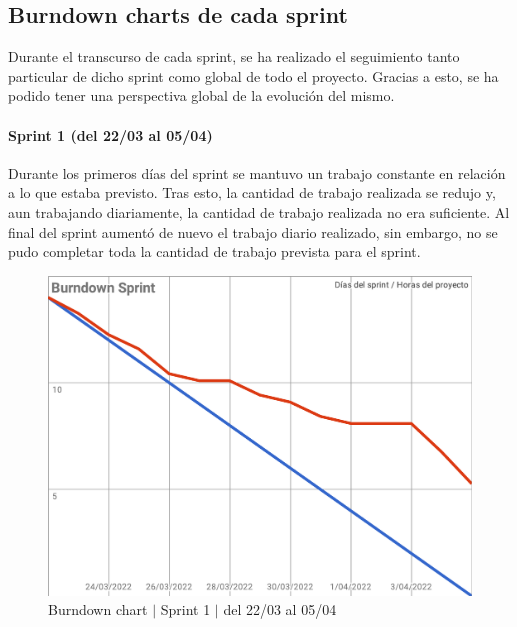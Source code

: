 \newpage
\subsection{Burndown charts de cada sprint}
Durante el transcurso de cada sprint, se ha realizado el seguimiento tanto particular de dicho sprint como global de todo el proyecto. Gracias a esto, se ha podido tener una perspectiva global de la evolución del mismo.

\paragraph{Sprint 1 (del 22/03 al 05/04)} 
Durante los primeros días del sprint se mantuvo un trabajo constante en relación a lo que estaba previsto. Tras esto, la cantidad de trabajo realizada se redujo y, aun trabajando diariamente, la cantidad de trabajo realizada no era suficiente. Al final del sprint aumentó de nuevo el trabajo diario realizado, sin embargo, no se pudo completar toda la cantidad de trabajo prevista para el sprint.
\begin{figure}[H]
    \centering
    \includegraphics[width=1\linewidth]{text/image/BurndownChart1.pdf}
    \caption{Burndown chart $|$ Sprint 1 $|$ del 22/03 al 05/04}
    \label{fig:burndown_chart_1}
\end{figure}

\newpage
